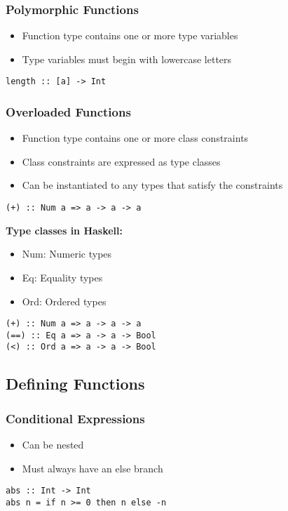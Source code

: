 \subsubsection{Polymorphic Functions}
\begin{itemize}
    \item Function type contains one or more type variables
    \item Type variables must begin with lowercase letters
\end{itemize}
\begin{lstlisting}
length :: [a] -> Int
\end{lstlisting}

\subsubsection{Overloaded Functions}
\begin{itemize}
    \item Function type contains one or more class constraints
    \item Class constraints are expressed as type classes
    \item Can be instantiated to any types that satisfy the constraints
\end{itemize}
\begin{lstlisting}
(+) :: Num a => a -> a -> a
\end{lstlisting}
\textbf{Type classes in Haskell:}
\begin{itemize}
    \item Num: Numeric types
    \item Eq: Equality types
    \item Ord: Ordered types
\end{itemize}
\begin{lstlisting}
(+) :: Num a => a -> a -> a
(==) :: Eq a => a -> a -> Bool
(<) :: Ord a => a -> a -> Bool
\end{lstlisting}

\subsection{Defining Functions}
\subsubsection{Conditional Expressions}
\begin{itemize}
    \item Can be nested
    \item Must always have an else branch
\end{itemize}
\begin{lstlisting}
abs :: Int -> Int
abs n = if n >= 0 then n else -n
\end{lstlisting}

